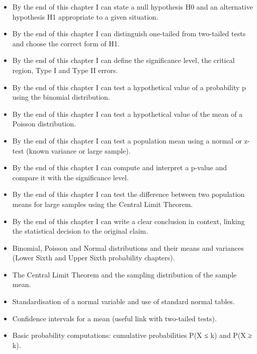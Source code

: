 \documentclass[11pt]{article}
\begin{document}
\begin{objectifs}
\begin{itemize}
\item By the end of this chapter I can state a null hypothesis H0 and an alternative hypothesis H1 appropriate to a given situation.
\item By the end of this chapter I can distinguish one-tailed from two-tailed tests and choose the correct form of H1.
\item By the end of this chapter I can define the significance level, the critical region, Type I and Type II errors.
\item By the end of this chapter I can test a hypothetical value of a probability p using the binomial distribution.
\item By the end of this chapter I can test a hypothetical value of the mean of a Poisson distribution.
\item By the end of this chapter I can test a population mean using a normal or z-test (known variance or large sample).
\item By the end of this chapter I can compute and interpret a p-value and compare it with the significance level.
\item By the end of this chapter I can test the difference between two population means for large samples using the Central Limit Theorem.
\item By the end of this chapter I can write a clear conclusion in context, linking the statistical decision to the original claim.
\end{itemize}
\end{objectifs}

\begin{prerequis}
\begin{itemize}
\item Binomial, Poisson and Normal distributions and their means and variances (Lower Sixth and Upper Sixth probability chapters).
\item The Central Limit Theorem and the sampling distribution of the sample mean.
\item Standardisation of a normal variable and use of standard normal tables.
\item Confidence intervals for a mean (useful link with two-tailed tests).
\item Basic probability computations: cumulative probabilities P(X ≤ k) and P(X ≥ k).
\end{itemize}
\end{prerequis}
\end{document}

